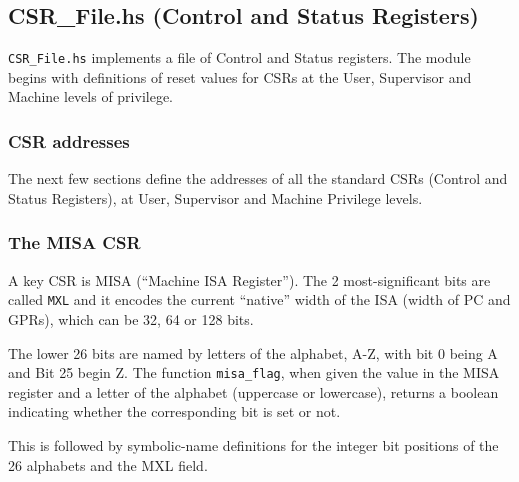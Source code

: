 \documentclass[11pt]{article}
\begin{document}



\subsection{CSR\_File.hs (Control and Status Registers)}

\label{sec_csrs}

\verb|CSR_File.hs| implements a file of Control and Status registers.
The module begins with definitions of reset values for CSRs at the
User, Supervisor and Machine levels of privilege.


\subsubsection{CSR addresses}

The next few sections define the addresses of all the standard CSRs
(Control and Status Registers), at User, Supervisor and Machine
Privilege levels.




\subsubsection{The MISA CSR}

A key CSR is MISA (``Machine ISA Register'').  The 2 most-significant
bits are called \verb|MXL| and it encodes the current ``native'' width
of the ISA (width of PC and GPRs), which can be 32, 64 or 128 bits.



The lower 26 bits are named by letters of the alphabet, A-Z, with bit
0 being A and Bit 25 begin Z.  The function \verb|misa_flag|, when
given the value in the MISA register and a letter of the alphabet
(uppercase or lowercase), returns a boolean indicating whether the
corresponding bit is set or not.



This is followed by symbolic-name definitions for the integer bit
positions of the 26 alphabets and the MXL field.


\end{document}
